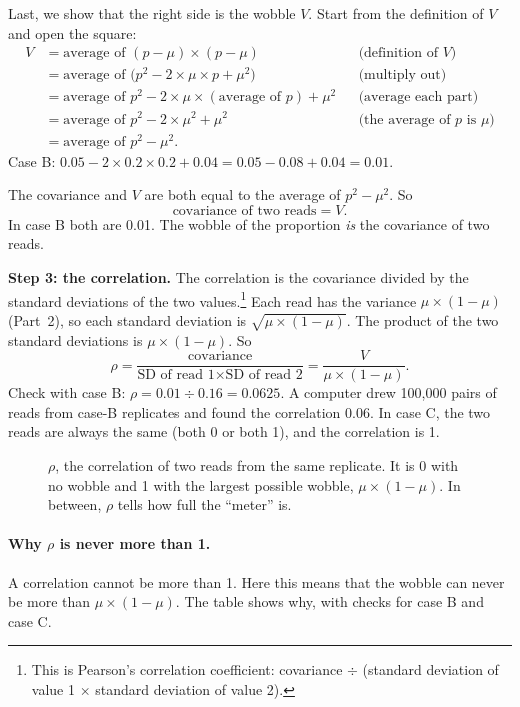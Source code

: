 Last, we show that the right side is the wobble $V$. Start from the
definition of $V$ and open the square:
\begin{align*}
V &= \text{average of } (p - \mu) \times (p - \mu)
 && \text{(definition of } V\text{)}\\
&= \text{average of } \bigl(p^2 - 2 \times \mu \times p + \mu^2\bigr)
 && \text{(multiply out)}\\
&= \text{average of } p^2 - 2 \times \mu \times (\text{average of } p) + \mu^2
 && \text{(average each part)}\\
&= \text{average of } p^2 - 2 \times \mu^2 + \mu^2
 && \text{(the average of } p \text{ is } \mu\text{)}\\
&= \text{average of } p^2 - \mu^2 .
\end{align*}
Case B: $0.05 - 2 \times 0.2 \times 0.2 + 0.04 = 0.05 - 0.08 + 0.04 = 0.01$.

The covariance and $V$ are both equal to the average of $p^2 - \mu^2$. So
\[
\text{covariance of two reads} = V .
\]
In case B both are 0.01. The wobble of the proportion
\emph{is} the covariance of two reads.

\textbf{Step 3: the correlation.} The correlation is the covariance divided
by the standard deviations of the two values.\footnote{This is Pearson's
correlation coefficient: covariance $\div$ (standard deviation of value 1
$\times$ standard deviation of value 2).} Each read has the variance
$\mu \times (1-\mu)$ (Part~2), so each standard deviation is
$\sqrt{\mu \times (1-\mu)}$. The product of the two standard deviations is
$\mu \times (1-\mu)$. So
\[
\rho = \frac{\text{covariance}}{\text{SD of read 1} \times \text{SD of read 2}}
 = \frac{V}{\mu \times (1-\mu)} .
\]
Check with case B: $\rho = 0.01 \div 0.16 = 0.0625$. A computer drew
100{,}000 pairs of reads from case-B replicates and found the correlation
0.06. In case C, the two reads are always the same (both 0 or both 1), and
the correlation is 1.

\begin{figure}[ht]
\centering

\caption{$\rho$, the correlation of two reads from the same replicate. It is
0 with no wobble and 1 with the largest possible wobble,
$\mu \times (1-\mu)$. In between, $\rho$ tells how full the ``meter'' is.}
\label{fig:rho}
\end{figure}

\paragraph{Why $\rho$ is never more than 1.} A correlation cannot be more
than 1. Here this means that the wobble can never be more than
$\mu \times (1-\mu)$. The table shows why, with checks for case B and case
C.

